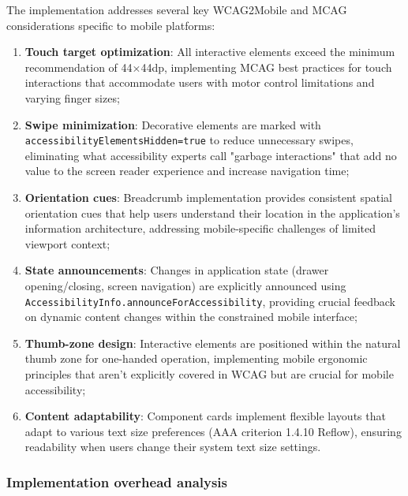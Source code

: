 The implementation addresses several key WCAG2Mobile and MCAG considerations specific to mobile platforms:
\begin{enumerate}
    \item \textbf{Touch target optimization}: All interactive elements exceed the minimum recommendation of 44×44dp, implementing MCAG best practices for touch interactions that accommodate users with motor control limitations and varying finger sizes;
    
    \item \textbf{Swipe minimization}: Decorative elements are marked with \\ \texttt{accessibilityElementsHidden=true} to reduce unnecessary swipes, eliminating what accessibility experts call "garbage interactions" that add no value to the screen reader experience and increase navigation time;
    
    \item \textbf{Orientation cues}: Breadcrumb implementation provides consistent spatial orientation cues that help users understand their location in the application's information architecture, addressing mobile-specific challenges of limited viewport context;
    
    \item \textbf{State announcements}: Changes in application state (drawer opening/closing, screen navigation) are explicitly announced using \\ \texttt{AccessibilityInfo.announceForAccessibility}, providing crucial feedback on dynamic content changes within the constrained mobile interface;
    
    \item \textbf{Thumb-zone design}: Interactive elements are positioned within the natural thumb zone for one-handed operation, implementing mobile ergonomic principles that aren't explicitly covered in WCAG but are crucial for mobile accessibility;
    
    \item \textbf{Content adaptability}: Component cards implement flexible layouts that adapt to various text size preferences (AAA criterion 1.4.10 Reflow), ensuring readability when users change their system text size settings.
\end{enumerate}

\FloatBarrier

\subsubsection{Implementation overhead analysis}

